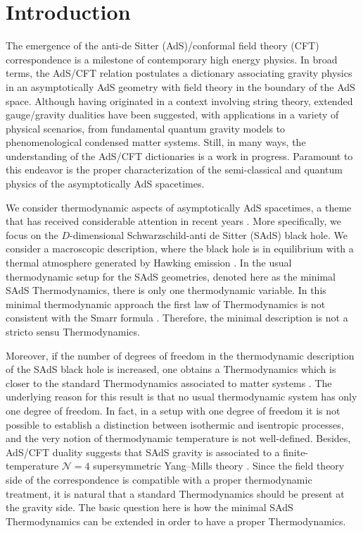\documentclass[prd,onecolumn,notitlepage,amsmath,nofootinbib,superscriptaddress,showpacs,showkeys]{revtex4-1}
\begin{document}
\section{Introduction}

The emergence of the anti-de Sitter (AdS)/conformal field theory (CFT)
correspondence \cite{maldacena,witten,gubser} is a milestone of
contemporary high energy physics. In broad terms, the AdS/CFT relation
postulates a dictionary associating gravity physics in an asymptotically
AdS geometry with field theory in the boundary of the AdS space. Although
having originated in a context involving string theory, extended gauge/gravity
dualities have been suggested, with applications in a variety of physical
scenarios, from fundamental quantum gravity models to phenomenological
condensed matter systems. Still, in many ways, the understanding of
the AdS/CFT dictionaries is a work in progress. Paramount to this
endeavor is the proper characterization of the semi-classical and
quantum physics of the asymptotically AdS spacetimes.

We consider thermodynamic aspects of asymptotically AdS spacetimes,
a theme that has received considerable attention in recent years \cite{brown,louko,hemming,grumiller,rajeev,morgan,miranda,hubeny,Rabin,menoufi,cardoso,myung,lemos}.
More specifically, we focus on the $D$-dimensional Schwarzschild-anti
de Sitter (SAdS) black hole. We consider a macroscopic description,
where the black hole is in equilibrium with a thermal atmosphere generated
by Hawking emission \cite{wald}. In the usual thermodynamic setup
for the SAdS geometries, denoted here as the minimal SAdS Thermodynamics,
there is only one thermodynamic variable. In this minimal thermodynamic
approach the first law of Thermodynamics is not consistent with the
Smarr formula \cite{kastor2009}. Therefore, the minimal description
is not a stricto sensu Thermodynamics.

Moreover, if the number of degrees of freedom in the thermodynamic
description of the SAdS black hole is increased, one obtains a Thermodynamics
which is closer to the standard Thermodynamics associated to matter
systems \cite{Joh14}. The underlying reason for this result is that
no usual thermodynamic system has only one degree of freedom. In fact,
in a setup with one degree of freedom it is not possible to establish
a distinction between isothermic and isentropic processes, and the very
notion of thermodynamic temperature is not well-defined. Besides,
AdS/CFT duality suggests that SAdS gravity is associated to a finite-temperature
$\mathcal{N}=4$ supersymmetric Yang--Mills theory \cite{nat2015}.
Since the field theory side of the correspondence is compatible with
a proper thermodynamic treatment, it is natural that a standard Thermodynamics
should be present at the gravity side. The basic question here is
how the minimal SAdS Thermodynamics can be extended in order to have
a proper Thermodynamics.
\end{document}
